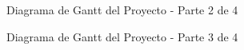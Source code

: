 \documentclass[
11pt, %
]{charter}
\begin{document}
\vspace{15px}

\begin{figure}[htpb]
\centering
{}
\caption{Diagrama de Gantt del Proyecto - Parte 2 de 4}
\label{fig:diagBloques}
\end{figure}

\vspace{15px}

\begin{figure}[htpb]
\centering
{}
\caption{Diagrama de Gantt del Proyecto - Parte 3 de 4}
\label{fig:diagBloques}
\end{figure}
\end{document}

